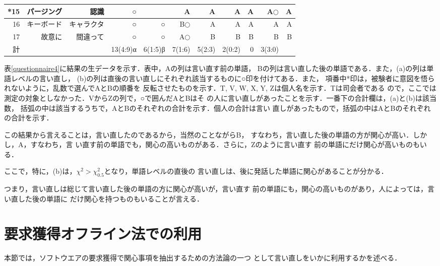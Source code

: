 \begin{table*}
\begin{scriptsize}
\begin{tabular}{|r|r||r|r|r||r|r|r|r|r|r|}
*15 & パージング & 認識 & ○ & & A & A & A & A & A\hspace{-3mm}$\bigcirc$ & A\\	\hline
16 & キーボード & キャラクタ & ○ & ○ & B\hspace{-3mm}$\bigcirc$ & A & A & A & A & A\\	\hline
17 & 故意に & 間違って & ○ & ○ & A\hspace{-3mm}$\bigcirc$ & B & B & B & B & B\\	\hline
計 & & & 13(4:9)α & 6(1:5)β & 7(1:6) & 5(2:3) & 2(0:2) & 0 & 3(3:0) &\\	\hline
\end{tabular}
\end{scriptsize}
\caption{アンケートの結果}
\label{questionnaire4}
\end{table*}

表\ref{questionnaire4}に結果の生データを示す．表中，Aの列は言い直す前の単語，
Bの列は言い直した後の単語である．また，(a)の列は単語レベルの言い直し，
(b)の列は直後の言い直しにそれぞれ該当するものに○印を付けてある．また，
項番中*印は，被験者に意図を悟られないように，乱数で選んでAとBの順番を
反転させたものを示す．T, V, W, X, Y, Zは個人名を示す．Tは司会者である
ので，ここでは測定の対象としなかった．VからZの列で，○で囲んだAとBはそ
の人に言い直しがあったことを示す．一番下の合計欄は，(a)と(b)は該当数，
括弧の中は該当するうちで，AとBのそれぞれの合計を示す．個人の合計は言い
直しがあったもので，括弧の中はAとBのそれぞれの合計を示す．

この結果から言えることは，言い直したのであるから，当然のことながらB，
すなわち，言い直した後の単語の方が関心が高い．しかし，A，すなわち，言
い直す前の単語でも，関心の高いものがある．さらに，Zのように言い直す
前の単語にだけ関心が高いものもいる．

ここで，特に，(b)は，$\chi^2 > \chi_{0.5}^2$となり，単語レベルの直後の
言い直しは、後に発話した単語に関心があることが分かる．

つまり，言い直しは総じて言い直した後の単語の方に関心が高いが，言い直す
前の単語にも，関心の高いものがあり，人によっては，言い直した後の単語に
だけ関心を持つものもいることが言える．

\section{要求獲得オフライン法での利用}

本節では，ソフトウエアの要求獲得で関心事項を抽出するための方法論の一つ
として言い直しをいかに利用するかを述べる．

